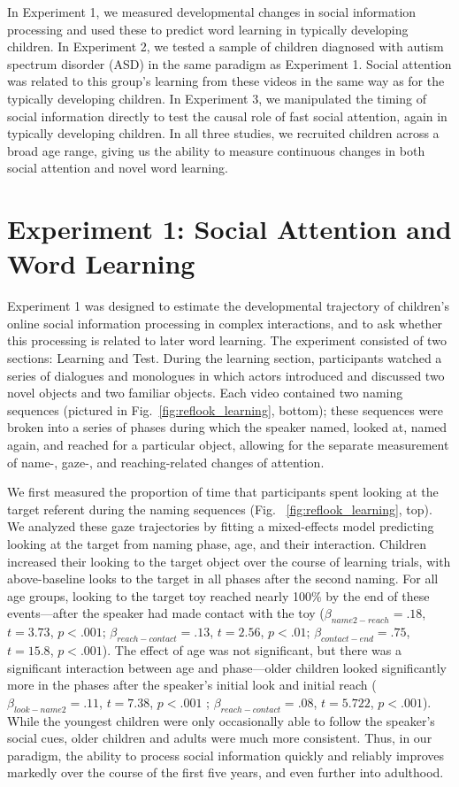 \documentclass[jou,floatsintext]{apa6}
\begin{document}
In Experiment 1, we measured developmental changes in social information processing and used these to predict word learning in typically developing children. In Experiment 2, we tested a sample of children diagnosed with autism spectrum disorder (ASD) in the same paradigm as Experiment 1. Social attention was related to this group’s learning from these videos in the same way as for the typically developing children. In Experiment 3, we manipulated the timing of social information directly to test the causal role of fast social attention, again in typically developing children. In all three studies, we recruited children across a broad age range, giving us the ability to measure continuous changes in both social attention and novel word learning.

\section{Experiment 1: Social Attention and Word Learning}

Experiment 1 was designed to estimate the developmental trajectory of children's online social information processing in complex interactions, and to ask whether this processing is related to later word learning. The experiment consisted of two sections: Learning and Test. During the learning section, participants watched a series of dialogues and monologues in which actors introduced and discussed two novel objects and two familiar objects. Each video contained two naming sequences (pictured in Fig.~\ref{fig:reflook_learning}, bottom); these sequences were broken into a series of phases during which the speaker named, looked at, named again, and reached for a particular object, allowing for the separate measurement of name-, gaze-, and reaching-related changes of attention.

We first measured the proportion of time that participants spent looking at the target referent during the naming sequences (Fig. ~\ref{fig:reflook_learning}, top). We analyzed these gaze trajectories by fitting a mixed-effects model predicting looking at the target from naming phase, age, and their interaction. Children increased their looking to the target object over the course of learning trials, with above-baseline looks to the target in all phases after the second naming. For all age groups, looking to the target toy reached nearly 100\% by the end of these events---after the speaker had made contact with the toy ($\beta_{name2-reach} = .18$, $t = 3.73$, $p < .001$; $\beta_{reach-contact} = .13$, $t = 2.56$, $p < .01$; $\beta_{contact-end} = .75$, $t = 15.8$, $p < .001$). The effect of age was not significant, but there was a significant interaction between age and phase---older children looked significantly more in the phases after the speaker's initial look and initial reach ($\beta_{look-name2} = .11$, $t = 7.38$, $p < .001$ ; $\beta_{reach-contact} = .08$, $t = 5.722$, $p < .001$). While the youngest children were only occasionally able to follow the speaker's social cues, older children and adults were much more consistent. Thus, in our paradigm, the ability to process social information quickly and reliably improves markedly over the course of the first five years, and even further into adulthood.
\end{document}
